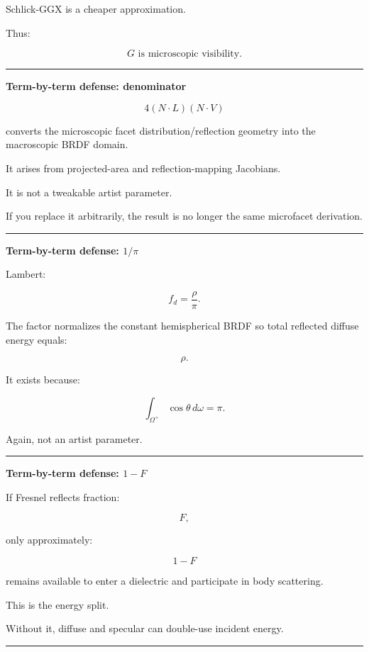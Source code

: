 Schlick-GGX is a cheaper approximation.

Thus:

\[
\boxed{
G\text{ is microscopic visibility.}
}
\]

\begin{center}\rule{0.5\linewidth}{0.5pt}\end{center}

\textbf{Term-by-term defense: denominator}

\[
4(N\cdot L)(N\cdot V)
\]

converts the microscopic facet distribution/reflection geometry into the macroscopic BRDF domain.

It arises from projected-area and reflection-mapping Jacobians.

It is not a tweakable artist parameter.

If you replace it arbitrarily, the result is no longer the same microfacet derivation.

\begin{center}\rule{0.5\linewidth}{0.5pt}\end{center}

\textbf{Term-by-term defense: \(1/\pi\)}

Lambert:

\[
f_d=
\frac{\rho}{\pi}.
\]

The factor normalizes the constant hemispherical BRDF so total reflected diffuse energy equals:

\[
\rho.
\]

It exists because:

\[
\int_{\Omega^+}\cos\theta\,d\omega=\pi.
\]

Again, not an artist parameter.

\begin{center}\rule{0.5\linewidth}{0.5pt}\end{center}

\textbf{Term-by-term defense: \(1-F\)}

If Fresnel reflects fraction:

\[
F,
\]

only approximately:

\[
1-F
\]

remains available to enter a dielectric and participate in body scattering.

This is the energy split.

Without it, diffuse and specular can double-use incident energy.

\begin{center}\rule{0.5\linewidth}{0.5pt}\end{center}

